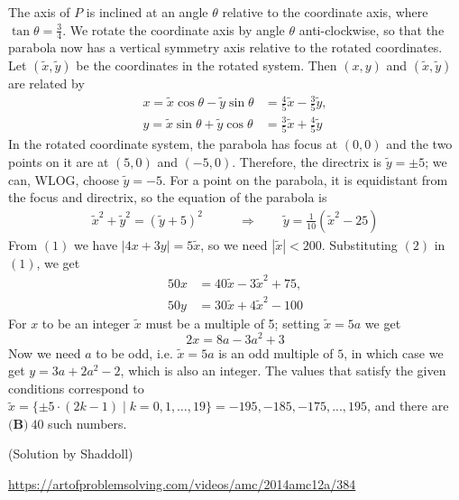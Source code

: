 \begin{enumerate}
The axis of $P$ is inclined at an angle $\theta$ relative to the coordinate axis, where $\tan\theta = \frac 34$. We rotate the coordinate axis by angle $\theta$ anti-clockwise, so that the parabola now has a vertical symmetry axis relative to the rotated coordinates. Let $(\widetilde{x}, \widetilde{y})$ be the coordinates in the rotated system. Then $(x,y)$ and $(\widetilde{x}, \widetilde{y})$ are related by 
 \begin{align}   \nonumber x = \widetilde{x}\cos\theta -\widetilde{y}\sin\theta &= \frac 45 \widetilde{x} - \frac 35 \widetilde{y}, \\    y = \widetilde{x}\sin\theta +\widetilde{y}\cos\theta &= \frac 35 \widetilde{x} + \frac 45 \widetilde{y} \end{align}In the rotated coordinate system, the parabola has focus at $(0,0)$ and the two points on it are at $(5,0)$ and $(-5,0)$. Therefore, the directrix is $\widetilde{y}=\pm 5$; we can, WLOG, choose $\widetilde{y}=-5$. For a point on the parabola, it is equidistant from the focus and directrix, so the equation of the parabola is 
 \begin{align}\tag{2}   \widetilde{x}^2+\widetilde{y}^2 = (\widetilde{y}+5)^2 \qquad  &\Longrightarrow\qquad \widetilde{y} = \frac{1}{10}(\widetilde{x}^2-25) \end{align}From $(1)$ we have $|4x+3y|=5\widetilde{x}$, so we need $|\widetilde{x}|<200$. Substituting $(2)$ in $(1)$, we get
 \begin{align*}   50x &= 40 \widetilde{x} - 3 \widetilde{x}^2 + 75, \\   50y &= 30 \widetilde{x} + 4 \widetilde{x}^2 - 100 \end{align*}
For $x$ to be an integer $\widetilde{x}$ must be a multiple of 5; setting $\widetilde{x}=5a$ we get 
 \[2x = 8a - 3 a^2 + 3\]Now we need $a$ to be odd, i.e. $\widetilde{x}=5a$ is an odd multiple of $5$, in which case we get $y = 3 a + 2 a^2 - 2$, which is also an integer. The values that satisfy the given conditions correspond to $\widetilde{x}= \{\pm 5\cdot (2k-1)\mid k = 0, 1, \ldots , 19 \}={-195, -185, -175, ..., 195}$, and there are $\boxed{\textbf{(B)} \ 40}$ such numbers.

 (Solution by Shaddoll)

 \href{https://artofproblemsolving.com/videos/amc/2014amc12a/384}{https://artofproblemsolving.com/videos/amc/2014amc12a/384}

 


\end{enumerate}